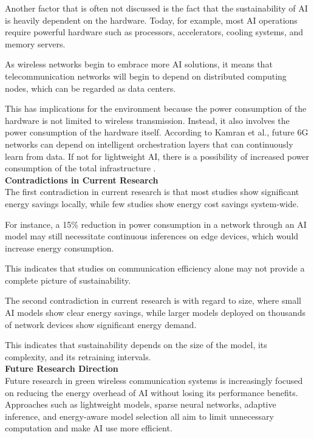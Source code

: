 \documentclass[letterpaper]{article} %
\begin{document}
Another factor that is often not discussed is the fact that the sustainability of AI is heavily dependent on the hardware. Today, for example, most AI operations require powerful hardware such as processors, accelerators, cooling systems, and memory servers.

As wireless networks begin to embrace more AI solutions, it means that telecommunication networks will begin to depend on distributed computing nodes, which can be regarded as data centers.

This has implications for the environment because the power consumption of the hardware is not limited to wireless transmission. Instead, it also involves the power consumption of the hardware itself. According to Kamran et al., future 6G networks can depend on intelligent orchestration layers that can continuously learn from data. If not for lightweight AI, there is a possibility of increased power consumption of the total infrastructure \cite{kamran_energy-aware_2025}.\\

\textbf{Contradictions in Current Research}\\

The first contradiction in current research is that most studies show significant energy savings locally, while few studies show energy cost savings system-wide.

For instance, a 15\% reduction in power consumption in a network through an AI model may still necessitate continuous inferences on edge devices, which would increase energy consumption.

This indicates that studies on communication efficiency alone may not provide a complete picture of sustainability.

The second contradiction in current research is with regard to size, where small AI models show clear energy savings, while larger models deployed on thousands of network devices show significant energy demand.

This indicates that sustainability depends on the size of the model, its complexity, and its retraining intervals.\\

\textbf{Future Research Direction}\\

Future research in green wireless communication systems is increasingly focused on reducing the energy overhead of AI without losing its performance benefits. Approaches such as lightweight models, sparse neural networks, adaptive inference, and energy-aware model selection all aim to limit unnecessary computation and make AI use more efficient. 
\end{document}
